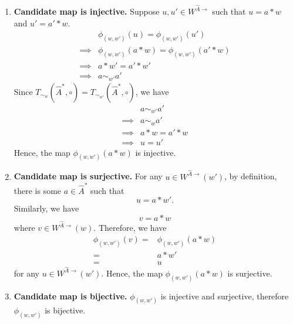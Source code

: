 \begin{proofE}
\begin{enumerate}
\begin{enumerate}
        \item \textbf{Candidate map is injective.}
        Suppose $u, u' \in W^{\hat{A}\to}$ such that $u = a \ast w$ and $u' = a' \ast w$.
        \begin{align}
            & \phi_{(w, w')}(u) = \phi_{(w, w')}(u') \\
            \implies & \phi_{(w, w')}(a \ast w) = \phi_{(w, w')}(a' \ast w) \\
            \implies & a \ast w' = a' \ast w' \\
            \implies & a \sim_{w'} a'
        \end{align}
        Since $T_{\sim_{w}}(\hat{A}^{*}, \circ) = T_{\sim_{w'}}(\hat{A}^{*}, \circ)$, we have
        \begin{align}
            & a \sim_{w'} a' \\
            \implies & a \sim_{w} a' \\
            \implies & a \ast w = a' \ast w \\
            \implies & u = u'
        \end{align}
        Hence, the map $\phi_{(w, w')}(a \ast w)$ is injective.

        \item \textbf{Candidate map is surjective.}
        For any $u \in W^{\hat{A}\to}(w')$, by definition, there is some $a \in \hat{A}^{*}$ such that
        \begin{equation}
            u = a \ast w'.
        \end{equation}
        Similarly, we have
        \begin{equation}
            v = a \ast w
        \end{equation}
        where $v \in W^{\hat{A}\to}(w)$.
        Therefore, we have
        \begin{align}
            \phi_{(w, w')}(v) = & \phi_{(w, w')}(a \ast w) \\
            = & a \ast w' \\
            = & u
        \end{align}
        for any $u \in W^{\hat{A}\to}(w')$.
        Hence, the map $\phi_{(w, w')}(a \ast w)$ is surjective.

        \item \textbf{Candidate map is bijective.}
        $\phi_{(w, w')}$ is injective and surjective, therefore $\phi_{(w, w')}$ is bijective.


\end{enumerate}
\end{enumerate}
\end{proofE}

